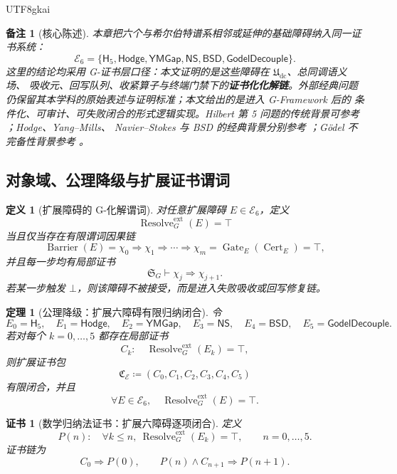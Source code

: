 \documentclass[12pt]{article}
\newtheorem{definition}{定义}[section]
\newtheorem{theorem}{定理}[section]
\newtheorem{remark}{备注}[section]
\newtheorem{Certificate}{证书}[section]
\newcommand{\GFramework}{\textsf{G-Framework}}
\newcommand{\Udc}{\mathfrak{U}_{\mathrm{dc}}}
\newcommand{\DefEq}{\coloneqq}
\DeclareMathOperator{\Cert}{Cert}
\DeclareMathOperator{\Resolve}{Resolve}
\DeclareMathOperator{\Barrier}{Barrier}
\DeclareMathOperator{\Gate}{Gate}
\begin{document}
\begin{CJK*}{UTF8}{gkai}
\begin{remark}[核心陈述]
本章把六个与希尔伯特谱系相邻或延伸的基础障碍纳入同一证书系统：
\[
  \mathcal E_6
  =
  \{
  \mathsf H_5,\mathsf{Hodge},\mathsf{YMGap},
  \mathsf{NS},\mathsf{BSD},\mathsf{GodelDecouple}
  \}.
\]
这里的结论均采用 G-证书层口径：本文证明的是这些障碍在 \(\Udc\)、总同调语义场、
吸收元、回写队列、收紧算子与终端门禁下的\textbf{证书化化解链}。外部经典问题
仍保留其本学科的原始表述与证明标准；本文给出的是进入 \GFramework{} 后的
条件化、可审计、可失败闭合的形式逻辑实现。Hilbert 第 5 问题的传统背景可参考
\cite{Gleason1952HilbertFifth,MontgomeryZippin1955TopologicalGroups}；Hodge、Yang--Mills、
Navier--Stokes 与 BSD 的经典背景分别参考
\cite{Voisin2002Hodge,GriffithsHarris1978,JaffeWitten2000YM,Fefferman2000NS,Temam2001NS,
BirchSwinnertonDyer1965,Silverman2009AEC}；Gödel 不完备性背景参考
\cite{Godel1931}。
\end{remark}

\subsection{对象域、公理降级与扩展证书谓词}
\label{subsec:tex59-extended-domain}

\begin{definition}[扩展障碍的 G-化解谓词]
\label{def:tex59-extended-resolution}
对任意扩展障碍 \(E\in\mathcal E_6\)，定义
\[
  \Resolve_G^{\mathrm{ext}}(E)=\top
\]
当且仅当存在有限谓词因果链
\[
  \Barrier(E)=\chi_0
  \Longrightarrow
  \chi_1
  \Longrightarrow
  \cdots
  \Longrightarrow
  \chi_m=
  \Gate_E(\Cert_E)=\top,
\]
并且每一步均有局部证书
\[
  \mathfrak S_G\vdash \chi_j\Rightarrow\chi_{j+1}.
\]
若某一步触发 \(\bot\)，则该障碍不被接受，而是进入失败吸收或回写修复链。
\end{definition}

\begin{theorem}[公理降级：扩展六障碍有限归纳闭合]
\label{thm:tex59-extended-axiom-downgrade}
令
\[
  E_0=\mathsf H_5,\quad
  E_1=\mathsf{Hodge},\quad
  E_2=\mathsf{YMGap},\quad
  E_3=\mathsf{NS},\quad
  E_4=\mathsf{BSD},\quad
  E_5=\mathsf{GodelDecouple}.
\]
若对每个 \(k=0,\ldots,5\) 都存在局部证书
\[
  C_k:\quad \Resolve_G^{\mathrm{ext}}(E_k)=\top,
\]
则扩展证书包
\[
  \mathfrak C_{\mathcal E}
  \DefEq
  (C_0,C_1,C_2,C_3,C_4,C_5)
\]
有限闭合，并且
\[
  \forall E\in\mathcal E_6,\quad
  \Resolve_G^{\mathrm{ext}}(E)=\top.
\]
\end{theorem}

\begin{Certificate}[数学归纳法证书：扩展六障碍逐项闭合]
\label{cert:tex59-extended-axiom-downgrade}
定义
\[
  P(n):\quad
  \forall k\le n,\ \Resolve_G^{\mathrm{ext}}(E_k)=\top,
  \qquad n=0,\ldots,5.
\]
证书链为
\[
  C_0\Rightarrow P(0),
  \qquad
  P(n)\wedge C_{n+1}\Rightarrow P(n+1).
\]
\end{Certificate}


\end{CJK*}
\end{document}
